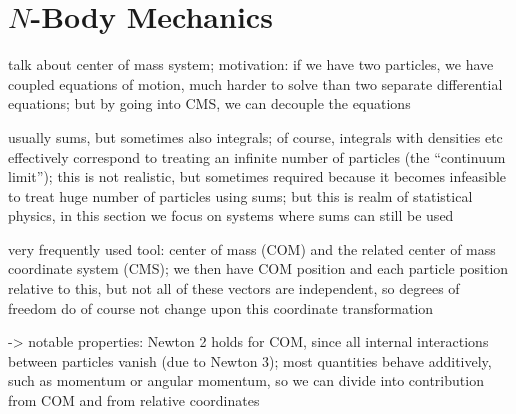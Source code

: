 \documentclass[../class_mech_main.tex]{subfiles}
\begin{document}
	\section{$N$-Body Mechanics}
talk about center of mass system; motivation: if we have two particles, we have coupled equations of motion, much harder to solve than two separate differential equations; but by going into CMS, we can decouple the equations


usually sums, but sometimes also integrals; of course, integrals with densities etc effectively correspond to treating an infinite number of particles (the \enquote{continuum limit});
this is not realistic, but sometimes required because it becomes infeasible to treat huge number of particles using sums; but this is realm of statistical physics, in this section we focus on systems where sums can still be used



very frequently used tool: center of mass (COM) and the related center of mass coordinate system (CMS); we then have COM position and each particle position relative to this, but not all of these vectors are independent, so degrees of freedom do of course not change upon this coordinate transformation


-> notable properties: Newton 2 holds for COM, since all internal interactions between particles vanish (due to Newton 3); most quantities behave additively, such as momentum or angular momentum, so we can divide into contribution from COM and from relative coordinates
\end{document}
